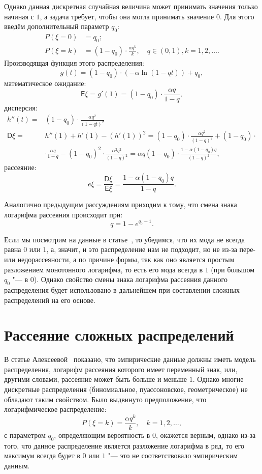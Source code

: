\documentclass[12pt, specialist, subf, substylefile = spbu_report.rtx]{disser}
\begin{document}
	Однако данная дискретная случайная величина может принимать значения только начиная с $ 1 $, а задача требует, чтобы она могла принимать значение $ 0 $. Для этого введём дополнительный параметр $ q _0 $:
	\[
		\begin{aligned}
			P(\xi = 0) &= q _0;\\
			P(\xi = k) &= (1 - q _0) \cdot \frac {\alpha q ^k} {k},\quad q \in (0, 1), k = 1, 2, \dots.
		\end{aligned}
	\]
	Производящая функция этого распределения:
	\[
		g(t) = (1 - q _0) \cdot (- \alpha \ln (1 - qt)) + q _0,
	\]
	математическое ожидание:
	\[ \mathsf{E} \xi = g' (1) = (1 - q _0) \cdot \frac {\alpha q} {1 - q}, \]
	дисперсия:
	\[
		\begin{aligned}
			h'' (t) =& (1 - q _0) \cdot \frac {\alpha q ^2} {(1 - qt) ^2}\\
			\mathsf{D} \xi =& h''(1) + h'(1) - \left( h' (1) 	\right) ^2 = (1 - q _0) \cdot \frac {\alpha q ^2} {(1 - q) ^2} + (1 - q _0) \cdot\\
			&\cdot \frac {\alpha q} {1 - q} - (1 - q _0) ^2 \cdot \frac {\alpha ^2 q ^2} {(1 - q) ^2} = \alpha q (1 - q _0) \cdot \frac {1 - \alpha (1 - q _0)q} {(1 - q) ^2},
		\end{aligned}
	\]
	рассеяние:
	\[ e\xi = \frac {\mathsf{D} \xi} {\mathsf{E} \xi} = \frac {1 - \alpha (1 - q _0)q} {1 - q}.\]
	
	Аналогично предыдущим рассуждениям приходим к тому, что смена знака логарифма рассеяния происходит при:
	\[ q = 1 - e ^{q _0 - 1}. \]
	
	Если мы посмотрим на данные в статье~\cite{bib:alexeeva2008}, то убедимся, что их мода не всегда равна $ 0 $ или $ 1 $, а, значит, и это распределение нам не подходит, но не из-за пере- или недорассеяности, а по причине формы, так как оно является простым разложением монотонного логарифма, то есть его мода всегда в $ 1 $ (при большом $ q _0 $ "--- в $ 0 $). Однако свойство смены знака логарифма рассеяния данного распределения будет использовано в дальнейшем при составлении сложных распределений на его основе.
	
	\section{Рассеяние сложных распределений}
	
	В статье Алексеевой~\cite{bib:alexeeva2008} показано, что эмпирические данные должны иметь модель распределения, логарифм рассеяния которого имеет переменный знак, или, другими словами, рассеяние может быть больше и меньше $ 1 $. Однако многие дискретные распределения (биномиальное, пуассоновское, геометрическое) не обладают таким свойством. Было выдвинуто предположение, что логарифмическое распределение:
	\[ P(\xi = k) = \frac {\alpha q ^k} {k},\quad k = 1, 2, \dots,\]
	с параметром $ q _0 $, определяющим вероятность в $ 0 $, окажется верным, однако из-за того, что данное распределение является разложение логарифма в ряд, то его максимум всегда будет в $ 0 $ или $ 1 $ "--- это не соответствовало эмпирическим данным.
	
\end{document}
